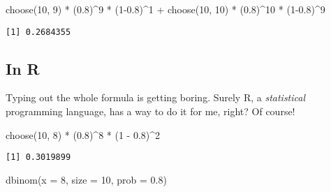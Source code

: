 \documentclass[
  letterpaper,
  DIV=11,
  numbers=noendperiod]{scrreprt}
\newenvironment{Shaded}{\begin{snugshade}}{\end{snugshade}}
\newcommand{\AttributeTok}[1]{\textcolor[rgb]{0.40,0.45,0.13}{#1}}
\newcommand{\DecValTok}[1]{\textcolor[rgb]{0.68,0.00,0.00}{#1}}
\newcommand{\FloatTok}[1]{\textcolor[rgb]{0.68,0.00,0.00}{#1}}
\newcommand{\FunctionTok}[1]{\textcolor[rgb]{0.28,0.35,0.67}{#1}}
\newcommand{\NormalTok}[1]{\textcolor[rgb]{0.00,0.23,0.31}{#1}}
\newcommand{\SpecialCharTok}[1]{\textcolor[rgb]{0.37,0.37,0.37}{#1}}
\begin{document}
\begin{Shaded}
\begin{Highlighting}[]
\FunctionTok{choose}\NormalTok{(}\DecValTok{10}\NormalTok{, }\DecValTok{9}\NormalTok{) }\SpecialCharTok{*}\NormalTok{ (}\FloatTok{0.8}\NormalTok{)}\SpecialCharTok{\^{}}\DecValTok{9} \SpecialCharTok{*}\NormalTok{ (}\DecValTok{1}\FloatTok{{-}0.8}\NormalTok{)}\SpecialCharTok{\^{}}\DecValTok{1} \SpecialCharTok{+}
  \FunctionTok{choose}\NormalTok{(}\DecValTok{10}\NormalTok{, }\DecValTok{10}\NormalTok{) }\SpecialCharTok{*}\NormalTok{ (}\FloatTok{0.8}\NormalTok{)}\SpecialCharTok{\^{}}\DecValTok{10} \SpecialCharTok{*}\NormalTok{ (}\DecValTok{1}\FloatTok{{-}0.8}\NormalTok{)}\SpecialCharTok{\^{}}\DecValTok{9}
\end{Highlighting}
\end{Shaded}

\begin{verbatim}
[1] 0.2684355
\end{verbatim}

\hypertarget{in-r}{%
\subsection{In R}\label{in-r}}

Typing out the whole formula is getting boring. Surely R, a
\emph{statistical} programming language, has a way to do it for me,
right? Of course!

\begin{Shaded}
\begin{Highlighting}[]
\FunctionTok{choose}\NormalTok{(}\DecValTok{10}\NormalTok{, }\DecValTok{8}\NormalTok{) }\SpecialCharTok{*}\NormalTok{ (}\FloatTok{0.8}\NormalTok{)}\SpecialCharTok{\^{}}\DecValTok{8} \SpecialCharTok{*}\NormalTok{ (}\DecValTok{1} \SpecialCharTok{{-}} \FloatTok{0.8}\NormalTok{)}\SpecialCharTok{\^{}}\DecValTok{2}
\end{Highlighting}
\end{Shaded}

\begin{verbatim}
[1] 0.3019899
\end{verbatim}

\begin{Shaded}
\begin{Highlighting}[]
\FunctionTok{dbinom}\NormalTok{(}\AttributeTok{x =} \DecValTok{8}\NormalTok{, }\AttributeTok{size =} \DecValTok{10}\NormalTok{, }\AttributeTok{prob =} \FloatTok{0.8}\NormalTok{)}
\end{Highlighting}
\end{Shaded}
\end{document}

